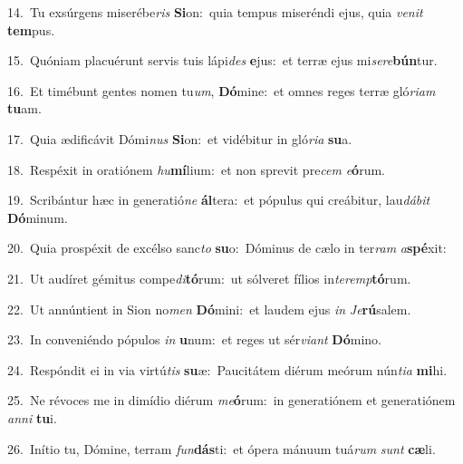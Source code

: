 {\numbfont\textcolor{\numbcolor}{14.}}~Tu exsúrgens miserébe\textit{ris} \textbf{Si}\-on:~\star quia tempus miseréndi ejus, quia \textit{ve}\-\textit{nit} \textbf{tem}\-pus.\par
{\numbfont\textcolor{\numbcolor}{15.}}~Quóniam placuérunt servis tuis lápi\textit{des} \textbf{e}\-jus:~\star et terræ ejus mi\-\textit{se}\-\textit{re}\textbf{bún}tur.\par
{\numbfont\textcolor{\numbcolor}{16.}}~Et timébunt gentes nomen tu\-\textit{um}\-, \textbf{Dó}\-mine:~\star et omnes reges terræ gló\-\textit{ri}\-\textit{am} \textbf{tu}\-am.\par
{\numbfont\textcolor{\numbcolor}{17.}}~Quia ædificávit Dómi\textit{nus} \textbf{Si}\-on:~\star et vidébitur in gló\-\textit{ri}\-\textit{a} \textbf{su}\-a.\par
{\numbfont\textcolor{\numbcolor}{18.}}~Respéxit in oratiónem \textit{hu}\-\textbf{mí}lium:~\star et non sprevit pre\textit{cem} \textit{e}\-\textbf{ó}rum.\par
{\numbfont\textcolor{\numbcolor}{19.}}~Scribántur hæc in generatió\textit{ne} \textbf{ál}\-tera:~\star et pópulus qui creábitur, lau\-\textit{dá}\-\textit{bit} \textbf{Dó}\-minum.\par
{\numbfont\textcolor{\numbcolor}{20.}}~Quia prospéxit de excélso sanc\textit{to} \textbf{su}\-o:~\star Dóminus de cælo in ter\textit{ram} \textit{a}\-\textbf{spé}xit:\par
{\numbfont\textcolor{\numbcolor}{21.}}~Ut audíret gémitus compe\-\textit{di}\-\textbf{tó}rum:~\star ut sólveret fílios in\-\textit{ter}\-\textit{emp}\textbf{tó}rum.\par
{\numbfont\textcolor{\numbcolor}{22.}}~Ut annúntient in Sion no\textit{men} \textbf{Dó}\-mini:~\star et laudem ejus \textit{in} \textit{Je}\-\textbf{rú}salem.\par
{\numbfont\textcolor{\numbcolor}{23.}}~In conveniéndo pópulos \textit{in} \textbf{u}\-num:~\star et reges ut sér\-\textit{vi}\-\textit{ant} \textbf{Dó}\-mino.\par
{\numbfont\textcolor{\numbcolor}{24.}}~Respóndit ei in via virtú\textit{tis} \textbf{su}\-æ:~\star Paucitátem diérum meórum nún\-\textit{ti}\-\textit{a} \textbf{mi}\-hi.\par
{\numbfont\textcolor{\numbcolor}{25.}}~Ne révoces me in dimídio diérum \textit{me}\-\textbf{ó}rum:~\star in generatiónem et generatiónem \textit{an}\-\textit{ni} \textbf{tu}\-i.\par
{\numbfont\textcolor{\numbcolor}{26.}}~Inítio tu, Dómine, terram \textit{fun}\-\textbf{dás}ti:~\star et ópera mánuum tuá\textit{rum} \textit{sunt} \textbf{cæ}\-li.\par
